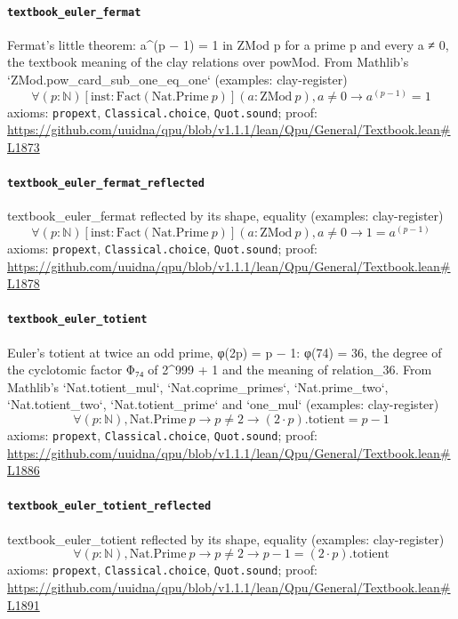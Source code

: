 \documentclass[11pt]{article}
\begin{document}
\paragraph{\texttt{textbook\_euler\_fermat}}
Fermat's little theorem: a\^{}(p − 1) = 1 in ZMod p for a prime p and every a ≠ 0, the textbook meaning of the clay relations over powMod. From Mathlib's `ZMod.pow\_card\_sub\_one\_eq\_one` (examples: clay-register)
\[ \forall (p : \mathbb{N}) [\mathrm{inst} : \mathrm{Fact} (\mathrm{Nat.Prime}\ p)] (a : \mathrm{ZMod}\ p), a \ne 0 \to a ^{(p - 1)} = 1 \]
\noindent axioms: \texttt{propext}, \texttt{Classical.choice}, \texttt{Quot.sound}; proof: \url{https://github.com/uuidna/qpu/blob/v1.1.1/lean/Qpu/General/Textbook.lean\#L1873}

\paragraph{\texttt{textbook\_euler\_fermat\_reflected}}
textbook\_euler\_fermat reflected by its shape, equality (examples: clay-register)
\[ \forall (p : \mathbb{N}) [\mathrm{inst} : \mathrm{Fact} (\mathrm{Nat.Prime}\ p)] (a : \mathrm{ZMod}\ p), a \ne 0 \to 1 = a ^{(p - 1)} \]
\noindent axioms: \texttt{propext}, \texttt{Classical.choice}, \texttt{Quot.sound}; proof: \url{https://github.com/uuidna/qpu/blob/v1.1.1/lean/Qpu/General/Textbook.lean\#L1878}

\paragraph{\texttt{textbook\_euler\_totient}}
Euler's totient at twice an odd prime, φ(2p) = p − 1: φ(74) = 36, the degree of the cyclotomic factor Φ₇₄ of 2\^{}999 + 1 and the meaning of relation\_36. From Mathlib's `Nat.totient\_mul`, `Nat.coprime\_primes`, `Nat.prime\_two`, `Nat.totient\_two`, `Nat.totient\_prime` and `one\_mul` (examples: clay-register)
\[ \forall (p : \mathbb{N}), \mathrm{Nat.Prime}\ p \to p \ne 2 \to (2 \cdot p)\mathrm{.totient} = p - 1 \]
\noindent axioms: \texttt{propext}, \texttt{Classical.choice}, \texttt{Quot.sound}; proof: \url{https://github.com/uuidna/qpu/blob/v1.1.1/lean/Qpu/General/Textbook.lean\#L1886}

\paragraph{\texttt{textbook\_euler\_totient\_reflected}}
textbook\_euler\_totient reflected by its shape, equality (examples: clay-register)
\[ \forall (p : \mathbb{N}), \mathrm{Nat.Prime}\ p \to p \ne 2 \to p - 1 = (2 \cdot p)\mathrm{.totient} \]
\noindent axioms: \texttt{propext}, \texttt{Classical.choice}, \texttt{Quot.sound}; proof: \url{https://github.com/uuidna/qpu/blob/v1.1.1/lean/Qpu/General/Textbook.lean\#L1891}
\end{document}
